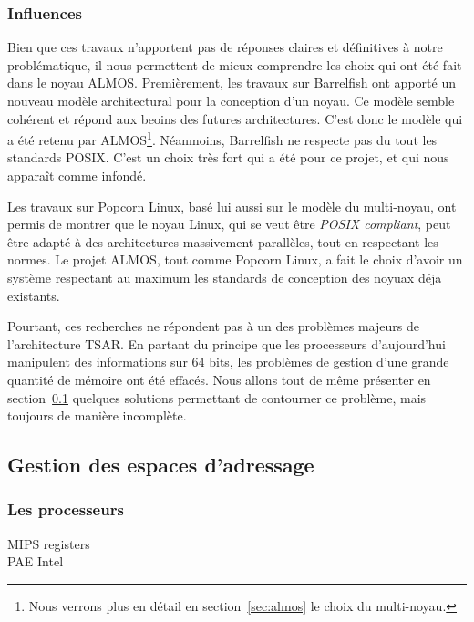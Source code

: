     \subsubsection{Influences}

      Bien que ces travaux n'apportent pas de réponses claires et définitives à
      notre problématique, il nous permettent de mieux comprendre les choix qui
      ont été fait dans le noyau ALMOS. Premièrement, les travaux sur Barrelfish
      ont apporté un nouveau modèle architectural pour la conception d'un
      noyau. Ce modèle semble cohérent et répond aux beoins des futures
      architectures. C'est donc le modèle qui a été retenu par
      ALMOS\footnote{Nous verrons plus en détail en section~\ref{sec:almos} le
        choix du multi-noyau.}. Néanmoins, Barrelfish ne respecte pas du tout
      les standards POSIX. C'est un choix très fort qui a été pour ce projet, et
      qui nous apparaît comme infondé.

      Les travaux sur Popcorn Linux, basé lui aussi sur le modèle du
      multi-noyau, ont permis de montrer que le noyau Linux, qui se veut être
      \textit{POSIX compliant}, peut être adapté à des architectures massivement
      parallèles, tout en respectant les normes. Le projet ALMOS, tout comme
      Popcorn Linux, a fait le choix d'avoir un système respectant au maximum
      les standards de conception des noyuax déja existants.

      Pourtant, ces recherches ne répondent pas à un des problèmes majeurs de
      l'architecture TSAR. En partant du principe que les processeurs
      d'aujourd'hui manipulent des informations sur 64 bits, les problèmes de
      gestion d'une grande quantité de mémoire ont été effacés. Nous allons tout
      de même présenter en section~\ref{sec:memory} quelques solutions
      permettant de contourner ce problème, mais toujours de manière incomplète.
    
     

  \subsection{Gestion des espaces d'adressage}
  \label{sec:memory}    

    \subsubsection{Les processeurs}

      MIPS registers\\
      PAE Intel


